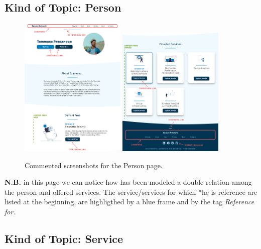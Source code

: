 \documentclass[12pt]{report}
\begin{document}
\subsection{Kind of Topic: Person}

\begin{figure}[H]
	\centering
	\includegraphics[width=0.45\textwidth]{high_fid_wireframes/person/1.png}
	\includegraphics[width=0.45\textwidth]{high_fid_wireframes/person/2.png}
	\caption{Commented screenshots for the Person page.}
\end{figure}
\textbf{N.B.} in this page we can notice how has been modeled a double relation
among the person and offered services. The service/services for which *he is reference
are listed at the beginning, are highligthed by a blue frame and by the tag \emph{Reference for}.
\subsection{Kind of Topic: Service}
\end{document}
